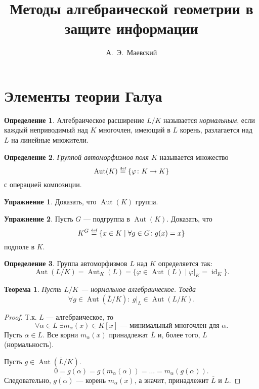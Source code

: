 \documentclass[12pt]{article}%
\title{Методы алгебраической геометрии в защите информации}
\author{А.~Э.~Маевский}
\date{}
\renewcommand{\phi}{\varphi}
\DeclareMathOperator{\Aut}{Aut}
\DeclareMathOperator{\Id}{id}
\newcommand{\eqdef}{\stackrel{\text{\upshape\tiny def}}{=}}
\newtheorem{Thm}{Теорема}[section]
\theoremstyle{remark}
\theoremstyle{definition}
\newtheorem{Exec}{Упражнение}
\newtheorem{Def}{Определение}[section]
\begin{document}
\maketitle
\thispagestyle{fancy}

\section{Элементы теории Галуа}
\begin{center}
%
\end{center}
\begin{Def}
Алгебраическое расширение $L/K$ называется \emph{нормальным}, если каждый
неприводимый над $K$ многочлен, имеющий в $L$ корень, разлагается над $L$ на
линейные множители.
\end{Def}

\begin{Def}\emph{Группой автоморфизмов поля $K$} называется множество
$$
    \Aut(K) \eqdef \{ \phi \colon K \to K \}
$$
с операцией композиции.
\end{Def}

\begin{Exec}
Доказать, что $\Aut(K)$ группа.
\end{Exec}

\begin{Exec}
Пусть $G$ — подгруппа в $\Aut(K)$. Доказать, что
$$
    K^G \eqdef \{ x \in K \mid \forall g \in G \colon g(x) = x \}
$$
подполе в $K$.
\end{Exec}

\begin{Def}
Группа автоморфизмов $L$ над $K$ определяется так:
$$
    \Aut(L / K) = \Aut_K(L) = \{ \phi \in \Aut(L) \mid \phi|_K = \Id_K \}.
$$
\end{Def}

\begin{Thm}
Пусть $L/K$ — нормальное алгебраическое. Тогда
$$
    \forall g \in \Aut(\overline L / K)\colon \: g|_L \in \Aut(L / K).
$$
\end{Thm}
\begin{proof}
Т.к. $L$ — алгебраическое, то
\[
    \forall \alpha \in L \; \exists m_{\alpha}(x) \in K[x] 
    \text{ — минимальный многочлен для $\alpha$.}
\]
Пусть $\alpha \in L$. Все корни $m_{\alpha}(x)$ принадлежат $\overline L$ и,
более того, $L$ (нормальность).

Пусть $g \in \Aut(\overline L / K)$. 
$$
    0 = g(\alpha) = g(m_\alpha (\alpha)) = \ldots = m_\alpha (g(\alpha)).
$$
Следовательно, $g(\alpha)$ — корень $m_\alpha(x)$, а значит, принадлежит
$\overline L$ и $L$.
\end{proof}
\end{document}
